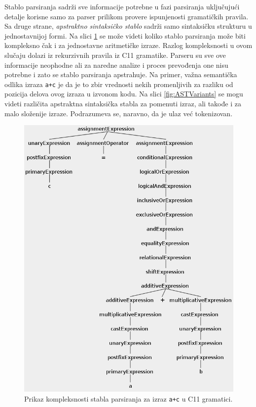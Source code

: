 Stablo parsiranja sadrži sve informacije potrebne u fazi parsiranja uključujući detalje korisne samo za parser prilikom provere ispunjenosti gramatičkih pravila. Sa druge strane, \emph{apstraktno sintaksičko stablo} sadrži samo sintaksičku strukturu u jednostavnijoj formi. Na slici \ref{fig:CompilationProcessPars1} se može videti koliko stablo parsiranja može biti kompleksno čak i za jednostavne aritmetičke izraze. Razlog kompleksnosti u ovom slučaju dolazi iz rekurzivnih pravila iz C11 gramatike. Parseru su sve ove informacije neophodne ali za naredne analize i proces prevođenja one nisu potrebne i zato se stablo parsiranja apstrahuje. Na primer, važna semantička odlika izraza \texttt{a+c} je da je to zbir vrednosti nekih promenljivih za razliku od pozicija delova ovog izraza u izvonom kodu. Na slici \ref{fig:ASTVariants} se mogu videti različita apstraktna sintaksička stabla za pomenuti izraz, ali takođe i za malo složenije izraze. Podrazumeva se, naravno, da je ulaz već tokenizovan. 

\begin{figure}[h!]
\centering
\includegraphics[scale=0.55]{images/parse_tree_expr.png}
\caption{Prikaz kompleksnosti stabla parsiranja za izraz 
\texttt{a+c} u C11 gramatici.} 
\label{fig:CompilationProcessPars1}
\end{figure}

